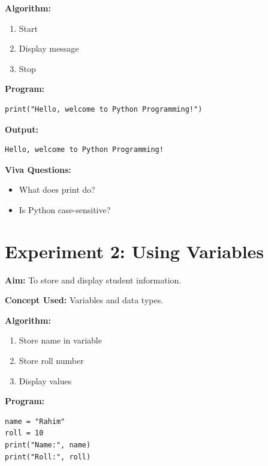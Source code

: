 \textbf{Algorithm:}
\begin{enumerate}
    \item Start
    \item Display message
    \item Stop
\end{enumerate}

\begin{center}
\end{center}

\textbf{Program:}
\begin{verbatim}
print("Hello, welcome to Python Programming!")
\end{verbatim}

\textbf{Output:}
\begin{verbatim}
Hello, welcome to Python Programming!
\end{verbatim}

\textbf{Viva Questions:}
\begin{itemize}
    \item What does print do?
    \item Is Python case-sensitive?
\end{itemize}

\newpage
\section*{Experiment 2: Using Variables}

\textbf{Aim:}  
To store and display student information.

\textbf{Concept Used:}  
Variables and data types.

\textbf{Algorithm:}
\begin{enumerate}
    \item Store name in variable
    \item Store roll number
    \item Display values
\end{enumerate}

\textbf{Program:}
\begin{verbatim}
name = "Rahim"
roll = 10
print("Name:", name)
print("Roll:", roll)
\end{verbatim}

